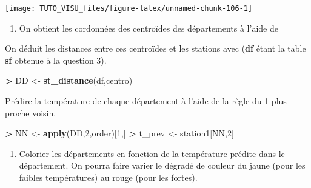 \documentclass[]{article}
\newenvironment{Shaded}{\begin{snugshade}}{\end{snugshade}}
\newcommand{\DataTypeTok}[1]{\textcolor[rgb]{0.13,0.29,0.53}{#1}}
\newcommand{\DecValTok}[1]{\textcolor[rgb]{0.00,0.00,0.81}{#1}}
\newcommand{\KeywordTok}[1]{\textcolor[rgb]{0.13,0.29,0.53}{\textbf{#1}}}
\newcommand{\NormalTok}[1]{#1}
\newcommand{\OperatorTok}[1]{\textcolor[rgb]{0.81,0.36,0.00}{\textbf{#1}}}
\newcommand{\StringTok}[1]{\textcolor[rgb]{0.31,0.60,0.02}{#1}}
\providecommand{\tightlist}{%
  \setlength{\itemsep}{0pt}\setlength{\parskip}{0pt}}
\theoremstyle{definition}
\theoremstyle{definition}
\theoremstyle{definition}
\theoremstyle{remark}
\begin{document}
\begin{center}\texttt{[image: TUTO\_VISU\_files/figure-latex/unnamed-chunk-106-1]} \end{center}

\begin{enumerate}
\def\labelenumi{\arabic{enumi}.}
\setcounter{enumi}{4}
\tightlist
\item
  On obtient les cordonnées des centroïdes des départements à l'aide de
\end{enumerate}

\begin{Shaded}
\end{Shaded}

On déduit les distances entre ces centroïdes et les stations avec (\textbf{df} étant la table \textbf{sf} obtenue à la question 3).

\begin{Shaded}
\begin{Highlighting}[]
\OperatorTok{>}\StringTok{ }\NormalTok{DD <-}\StringTok{ }\KeywordTok{st_distance}\NormalTok{(df,centro)}
\end{Highlighting}
\end{Shaded}

Prédire la température de chaque département à l'aide de la règle du 1 plus proche voisin.

\begin{Shaded}
\begin{Highlighting}[]
\OperatorTok{>}\StringTok{ }\NormalTok{NN <-}\StringTok{ }\KeywordTok{apply}\NormalTok{(DD,}\DecValTok{2}\NormalTok{,order)[}\DecValTok{1}\NormalTok{,]}
\OperatorTok{>}\StringTok{ }\NormalTok{t_prev <-}\StringTok{ }\NormalTok{station1[NN,}\DecValTok{2}\NormalTok{]}
\end{Highlighting}
\end{Shaded}

\begin{enumerate}
\def\labelenumi{\arabic{enumi}.}
\setcounter{enumi}{5}
\tightlist
\item
  Colorier les départements en fonction de la température prédite dans le département. On pourra faire varier le dégradé de couleur du jaune (pour les faibles températures) au rouge (pour les fortes).
\end{enumerate}
\end{document}
